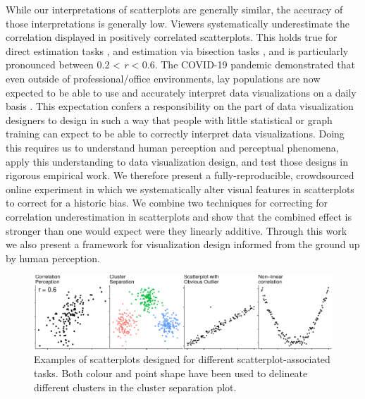 \documentclass[manuscript, anonymous, screen]{acmart}
\begin{document}
While our interpretations of scatterplots are generally similar, the
accuracy of those interpretations is generally low. Viewers
systematically underestimate the correlation displayed in positively
correlated scatterplots. This holds true for direct estimation tasks
\citep{strahan_1978, bobko_1979, cleveland_1982, lane_1985, lauer_1989, collyer_1990, meyer_1992},
and estimation via bisection tasks \citep{rensink_2017}, and is
particularly pronounced between 0.2 \textless{} \emph{r} \textless{}
0.6. The COVID-19 pandemic demonstrated that even outside of
professional/office environments, lay populations are now expected to be
able to use and accurately interpret data visualizations on a daily
basis \citep{bbc_2022}. This expectation confers a responsibility on the
part of data visualization designers to design in such a way that people
with little statistical or graph training can expect to be able to
correctly interpret data visualizations. Doing this requires us to
understand human perception and perceptual phenomena, apply this
understanding to data visualization design, and test those designs in
rigorous empirical work. We therefore present a fully-reproducible,
crowdsourced online experiment in which we systematically alter visual
features in scatterplots to correct for a historic bias. We combine two
techniques for correcting for correlation underestimation in
scatterplots and show that the combined effect is stronger than one
would expect were they linearly additive. Through this work we also
present a framework for visualization design informed from the ground up
by human perception.

\begin{figure}

{\centering \includegraphics[width=1\textwidth,height=\textheight]{size_and_contrast_new_files/figure-pdf/fig-tasks-1.pdf}

}

\caption{\label{fig-tasks}Examples of scatterplots designed for
different scatterplot-associated tasks. Both colour and point shape have
been used to delineate different clusters in the cluster separation
plot.}

\end{figure}
\end{document}
